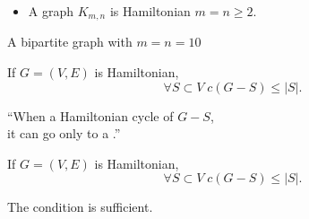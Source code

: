 \begin{frame}{}
  \begin{exampleblock}{}
    \begin{itemize}
      \item A  graph $K_{m, n}$ is Hamiltonian
         $m = n \ge 2$.
    \end{itemize}
  \end{exampleblock}

  \pause
  \vspace{0.50cm}

  \begin{center}
    A  bipartite graph with $m = n = 10$
  \end{center}
\end{frame}

\begin{frame}{}
  \begin{theorem}{}
    If $G = (V, E)$ is Hamiltonian,
    \[
      \forall S \subset V\; c(G - S) \le |S|.
    \]
  \end{theorem}

  \pause
  \vspace{0.50cm}

  \pause
  \begin{center}
    ``When a Hamiltonian cycle  of $G - S$, \\[3pt]
    it can go only to a .''
  \end{center}
\end{frame}

\begin{frame}{}
  \begin{theorem}{}
    If $G = (V, E)$ is Hamiltonian,
    \[
      \forall S \subset V\; c(G - S) \le |S|.
    \]
  \end{theorem}

  \pause
  \vspace{0.30cm}
  \begin{center}
    The condition is  sufficient.

    \pause

    \pause
    \begin{center}
    \end{center}
  \end{center}
\end{frame}

